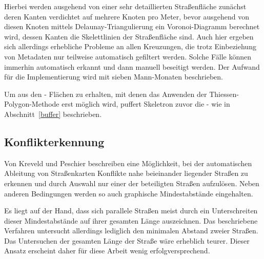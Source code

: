 \documentclass[../main/thesis.tex]{subfiles}
\begin{document}
Hierbei werden ausgehend von einer sehr detaillierten Straßenfläche zunächst deren Kanten verdichtet auf mehrere Knoten pro Meter, bevor ausgehend von diesen Knoten mittels Delaunay-Triangulierung ein Voronoi-Diagramm berechnet wird, dessen Kanten die Skelettlinien der Straßenfläche sind.
Auch hier ergeben sich allerdings erhebliche Probleme an allen Kreuzungen, die trotz Einbeziehung von Metadaten nur teilweise automatisch gefiltert werden.
Solche Fälle können immerhin automatisch erkannt und dann manuell beseitigt werden.
Der Aufwand für die Implementierung wird mit sieben Mann-Monaten beschrieben. 

Um aus den \osm- Flächen zu erhalten, mit denen das Anwenden der Thiessen-Polygon-Methode erst möglich wird, puffert Skeletron zuvor die \osm- wie in Abschnitt~\ref{buffer} beschrieben. 



\subsection{Konflikterkennung}


Von Kreveld und Peschier beschreiben eine Möglichkeit, bei der automatischen Ableitung von Straßenkarten Konflikte nahe beieinander liegender Straßen zu erkennen und durch Auswahl nur einer der beteiligten Straßen aufzulösen.
Neben anderen Bedingungen werden so auch graphische Mindestabstände eingehalten. 

Es liegt auf der Hand, dass sich parallele Straßen meist durch ein Unterschreiten dieser Mindestabstände auf ihrer gesamten Länge auszeichnen.
Das beschriebene Verfahren untersucht allerdings lediglich den minimalen Abstand zweier Straßen.
Das Untersuchen der gesamten Länge der Straße wäre erheblich teurer. 
Dieser Ansatz erscheint daher für diese Arbeit wenig erfolgversprechend.
\end{document}
